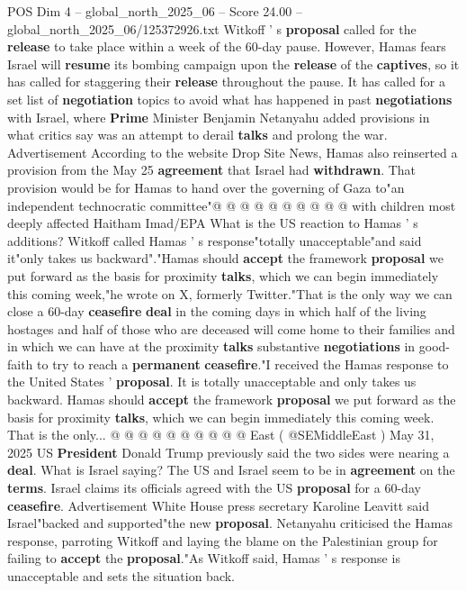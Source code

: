 \begin{textsample}{POS Dim 4 – global\_north\_2025\_06 – Score 24.00 – global\_north\_2025\_06/125372926.txt}
Witkoff ' s \textbf{proposal} called for the \textbf{release} to take place within a week of the 60-day pause.
However, Hamas fears Israel will \textbf{resume} its bombing campaign upon the \textbf{release} of the \textbf{captives}, so it has called for staggering their \textbf{release} throughout the pause.
It has called for a set list of \textbf{negotiation} topics to avoid what has happened in past \textbf{negotiations} with Israel, where \textbf{Prime} Minister Benjamin Netanyahu added provisions in what critics say was an attempt to derail \textbf{talks} and prolong the war.
Advertisement According to the website Drop Site News, Hamas also reinserted a provision from the May 25 \textbf{agreement} that Israel had \textbf{withdrawn}.
That provision would be for Hamas to hand over the governing of Gaza to"an independent technocratic committee"@ @ @ @ @ @ @ @ @ @ with children most deeply affected Haitham Imad/EPA What is the US reaction to Hamas ' s additions?
Witkoff called Hamas ' s response"totally unacceptable"and said it"only takes us backward"."Hamas should \textbf{accept} the framework \textbf{proposal} we put forward as the basis for proximity \textbf{talks}, which we can begin immediately this coming week,"he wrote on X, formerly Twitter."That is the only way we can close a 60-day \textbf{ceasefire} \textbf{deal} in the coming days in which half of the living hostages and half of those who are deceased will come home to their families and in which we can have at the proximity \textbf{talks} substantive \textbf{negotiations} in good-faith to try to reach a \textbf{permanent} \textbf{ceasefire}."I received the Hamas response to the United States ' \textbf{proposal}.
It is totally unacceptable and only takes us backward.
Hamas should \textbf{accept} the framework \textbf{proposal} we put forward as the basis for proximity \textbf{talks}, which we can begin immediately this coming week.
That is the only... @ @ @ @ @ @ @ @ @ @ East ( @SEMiddleEast ) May 31, 2025 US \textbf{President} Donald Trump previously said the two sides were nearing a \textbf{deal}.
What is Israel saying?
The US and Israel seem to be in \textbf{agreement} on the \textbf{terms}.
Israel claims its officials agreed with the US \textbf{proposal} for a 60-day \textbf{ceasefire}.
Advertisement White House press secretary Karoline Leavitt said Israel"backed and supported"the new \textbf{proposal}.
Netanyahu criticised the Hamas response, parroting Witkoff and laying the blame on the Palestinian group for failing to \textbf{accept} the \textbf{proposal}."As Witkoff said, Hamas ' s response is unacceptable and sets the situation back.

\end{textsample}

